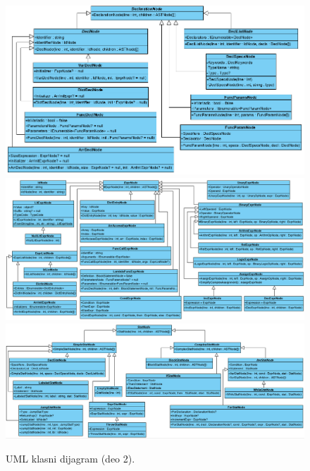 \begin{figure}[h!]
\centering
\includegraphics[scale=0.65]{images/uml/DeclarationNode.png}
\includegraphics[scale=0.55]{images/uml/ExpressionNode.png}
\includegraphics[scale=0.55]{images/uml/StatementNode.png}
\caption{UML klasni dijagram (deo 2).}
\label{fig:UMLASTNode2}
\end{figure}

